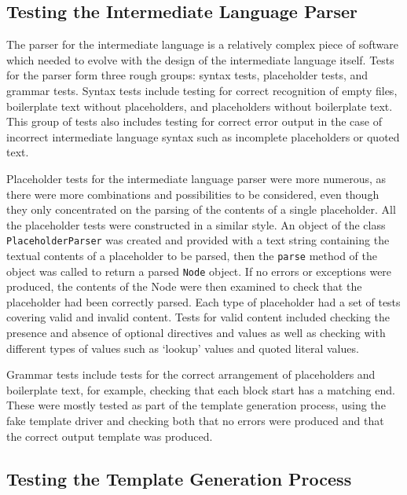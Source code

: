 \subsection*{Testing the Intermediate Language Parser}

The parser for the intermediate language is a relatively complex piece of software which needed to evolve with the design of the intermediate language itself. Tests for the parser form three rough groups: syntax tests, placeholder tests, and grammar tests. Syntax tests include testing for correct recognition of empty files, boilerplate text without placeholders, and placeholders without boilerplate text. This group of tests also includes testing for correct error output in the case of incorrect intermediate language syntax such as incomplete placeholders or quoted text.

Placeholder tests for the intermediate language parser were more numerous, as there were more combinations and possibilities to be considered, even though they only concentrated on the parsing of the contents of a single placeholder. All the placeholder tests were constructed in a similar style. An object of the class \verb!PlaceholderParser! was created and provided with a text string containing the textual contents of a placeholder to be parsed, then the \verb!parse! method of the object was called to return a parsed \verb!Node! object. If no errors or exceptions were produced, the contents of the Node were then examined to check that the placeholder had been correctly parsed. Each type of placeholder had a set of tests covering valid and invalid content. Tests for valid content included checking the presence and absence of optional directives and values as well as checking with different types of values such as `lookup' values and quoted literal values.

Grammar tests include tests for the correct arrangement of placeholders and boilerplate text, for example, checking that each block start has a matching end. These were mostly tested as part of the template generation process, using the fake template driver and checking both that no errors were produced and that the correct output template was produced.

\subsection*{Testing the Template Generation Process}

